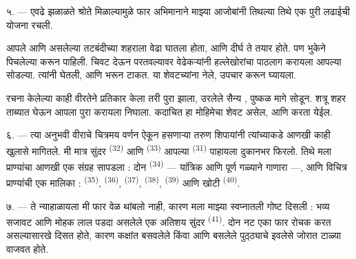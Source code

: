 ५. --- एवढे झळाळते श्रोते मिळाल्यामुळे फार अभिमानाने माझ्या आजोबांनी तिथल्या तिथे एक पुरी
लढाईची योजना रचली.

आपले  आणि  असलेल्या तटबंदीच्या शहराला  वेढा
घातला होता, आणि दीर्घ  ते  तयार होते. पण भुकेने
पिचलेल्या    
करून पाहिली.  चिवट  देऊन  परतवल्यावर
 वेढेकऱ्यांनी  हल्लेखोरांचा पाठलाग करायला आपल्या
 सोडल्या. त्यांनी  घेतली, 
 आणि  भरून टाकत.  या शेवटच्यांना
 नेले,  उपचार करून घ्यायला.

 रचना केलेल्या काही  वीरतेने प्रतिकार केला तरी  पुरा झाला, उरलेले सैन्य , पुष्कळ  मागे सोडून. शत्रू शहर ताब्यात घेऊन आपला  पुरा करायला निघाला. कदाचित हा मोहिमेचा शेवट असेल, आणि   करता येईल.

\VUsaut{4.4mm}
\VUsaut{2.8mm}

६. --- त्या अनुभवी वीराचे चित्रमय वर्णन ऐकून हसणाऱ्या तरुण शिपायांनी त्यांच्याकडे आणखी काही
खुलासे मागितले. मी मात्र सुंदर  \textsuperscript{(32)} आणि 
\textsuperscript{(33)} आपल्या  \textsuperscript{(31)} पाहायला दुकानभर फिरलो.
तिथे मला प्राण्यांचा आणखी एक संग्रह सापडला : दोन  \textsuperscript{(34)}
— यांत्रिक  आणि पूर्ण गळ्याने गाणारा  —, आणि विचित्र
प्राण्यांची एक मालिका :  \textsuperscript{(35)}, 
\textsuperscript{(36)},  \textsuperscript{(37)}, 
\textsuperscript{(38)},  \textsuperscript{(39)} आणि खोटी 
\textsuperscript{(40)}.

७. --- ते न्याहाळायला मी फार वेळ थांबलो नाही, कारण मला माझ्या स्वप्नातली गोष्ट दिसली : भव्य
सजावट आणि मोहक लाल पडदा असलेले एक अतिशय सुंदर 
\textsuperscript{(41)}.  दोन नट एका फार रोचक  
करत असल्यासारखे दिसत होते, कारण कक्षांत बसवलेले किंवा  आणि
  बसलेले पुठ्ठ्याचे इवलेसे
 जोरात टाळ्या वाजवत होते.

